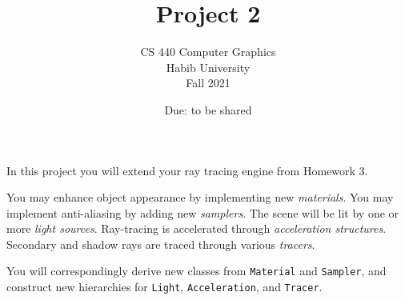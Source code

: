 \documentclass[addpoints]{exam}
\title{Project 2}
\author{CS 440 Computer Graphics\\Habib University\\Fall 2021}
\date{Due: to be shared}
\begin{document}
\maketitle
\thispagestyle{empty}

In this project you will extend your ray tracing engine from Homework 3.

You may enhance object appearance by implementing new \emph{materials}. You may implement anti-aliasing by adding new \textit{samplers}. The scene will be lit by one or more \emph{light sources}. Ray-tracing is accelerated through \textit{acceleration structures}. Secondary and shadow rays are traced through various \textit{tracers}.

You will correspondingly derive new classes from \texttt{Material} and \texttt{Sampler}, and construct new hierarchies for \texttt{Light}, \texttt{Acceleration}, and \texttt{Tracer}.
\end{document}
